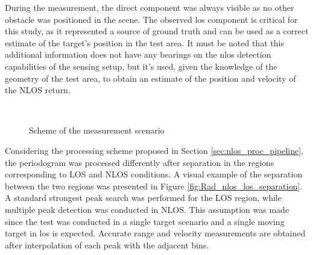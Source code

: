 During the measurement, the direct component was always visible as no other obstacle was positioned in the scene. 
The observed \gls{los} component is critical for this study, as it represented a source of ground truth and can be used as a correct estimate of the target's position in the test area.
It must be noted that this additional information does not have any bearings on the \gls{nlos} detection capabilities of the sensing setup, but it's used, given 
the knowledge of the geometry of the test area, to obtain an estimate of the position and velocity of the NLOS return. 

\begin{figure}[H]
	\centering
	
	\\
	\caption{Scheme of the measurement scenario}
	\label{fig:Test1_base_and_top_view}
\end{figure}

Considering the processing scheme proposed in Section \ref{sec:nlos_proc_pipeline}, the periodogram was processed differently after separation in the regions corresponding to LOS and NLOS conditions. A visual example of the separation between the two regions was presented in Figure \ref{fig:Rad_nlos_los_separation}.
A standard strongest peak search was performed for the LOS region, while multiple peak detection was conducted in NLOS. This assumption was made since the test was conducted in a single target scenario and a single moving target in \gls{los} is expected.
Accurate range and velocity measurements are obtained after interpolation of each peak with the adjacent bins.

